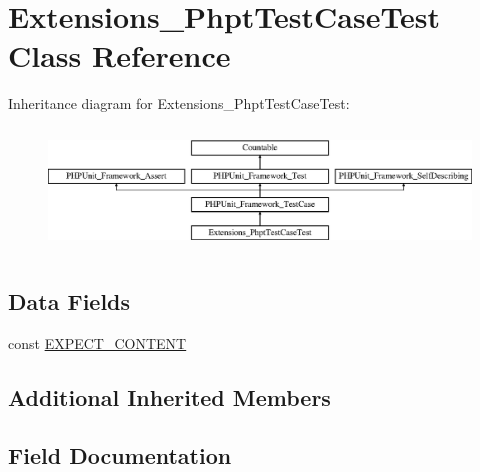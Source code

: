 \hypertarget{class_extensions___phpt_test_case_test}{}\section{Extensions\+\_\+\+Phpt\+Test\+Case\+Test Class Reference}
\label{class_extensions___phpt_test_case_test}
Inheritance diagram for Extensions\+\_\+\+Phpt\+Test\+Case\+Test\+:\begin{figure}[H]
\begin{center}
\leavevmode
\includegraphics[height=3.303835cm]{class_extensions___phpt_test_case_test}
\end{center}
\end{figure}
\subsection*{Data Fields}
\begin{DoxyCompactItemize}
\item 
const \mbox{\hyperlink{class_extensions___phpt_test_case_test_a18b73eb6461db50e56f235a067b1744d}{E\+X\+P\+E\+C\+T\+\_\+\+C\+O\+N\+T\+E\+NT}}
\end{DoxyCompactItemize}
\subsection*{Additional Inherited Members}


\subsection{Field Documentation}
\mbox{\label{class_extensions___phpt_test_case_test_a18b73eb6461db50e56f235a067b1744d}} 
